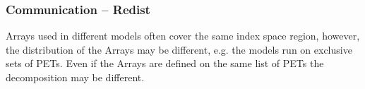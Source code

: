  
\setlength{\oldparskip}{\parskip}
\setlength{\parskip}{1.5ex}
\setlength{\oldparindent}{\parindent}
\setlength{\parindent}{0pt}
\setlength{\oldbaselineskip}{\baselineskip}
\setlength{\baselineskip}{11pt}
 
\def\bv{\begin{verbatim}}
\def\ev{\end{verbatim}}
\def\be{\begin{equation}}
\def\ee{\end{equation}}
\def\bea{\begin{eqnarray}}
\def\eea{\end{eqnarray}}
\def\bi{\begin{itemize}}
\def\ei{\end{itemize}}
\def\bn{\begin{enumerate}}
\def\en{\end{enumerate}}
\def\bd{\begin{description}}
\def\ed{\end{description}}
\def\({\left (}
\def\){\right )}
\def\[{\left [}
\def\]{\right ]}
\def\<{\left  \langle}
\def\>{\right \rangle}
\def\cI{{\cal I}}
\def\diag{\mathop{\rm diag}}
\def\tr{\mathop{\rm tr}}


 

  
   \subsubsection{Communication -- Redist}
   \label{Array:Redist}
   
   Arrays used in different models often cover the same index space region,
   however, the distribution of the Arrays may be different, e.g. the models
   run on exclusive sets of PETs. Even if the Arrays are defined on the same
   list of PETs the decomposition may be different. 

